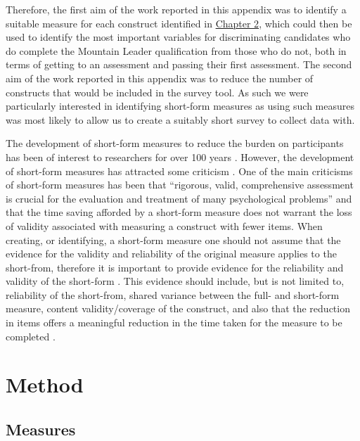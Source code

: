 \documentclass[
  12pt,
  a4paper,
]{book}
\begin{document}
Therefore, the first aim of the work reported in this appendix was to identify a suitable measure for each construct identified in \protect\hyperlink{ml-qualitative}{Chapter 2}, which could then be used to identify the most important variables for discriminating candidates who do complete the Mountain Leader qualification from those who do not, both in terms of getting to an assessment and passing their first assessment. The second aim of the work reported in this appendix was to reduce the number of constructs that would be included in the survey tool. As such we were particularly interested in identifying short-form measures as using such measures was most likely to allow us to create a suitably short survey to collect data with.

The development of short-form measures to reduce the burden on participants has been of interest to researchers for over 100 years \citep{Smith2000}. However, the development of short-form measures has attracted some criticism \citep[e.g.,][]{Levy1968, Smith2000, Wechsler1967}. One of the main criticisms of short-form measures has been that ``rigorous, valid, comprehensive assessment is crucial for the evaluation and treatment of many psychological problems'' \citep[p 102]{Smith2000} and that the time saving afforded by a short-form measure does not warrant the loss of validity associated with measuring a construct with fewer items. When creating, or identifying, a short-form measure one should not assume that the evidence for the validity and reliability of the original measure applies to the short-from, therefore it is important to provide evidence for the reliability and validity of the short-form \citep{Smith2000}. This evidence should include, but is not limited to, reliability of the short-from, shared variance between the full- and short-form measure, content validity/coverage of the construct, and also that the reduction in items offers a meaningful reduction in the time taken for the measure to be completed \citep{Horvath2018, Smith2000}.

\hypertarget{survey-tool-dev-method}{%
\section{Method}\label{survey-tool-dev-method}}

\hypertarget{survey-tool-dev-measures}{%
\subsection{Measures}\label{survey-tool-dev-measures}}
\end{document}
